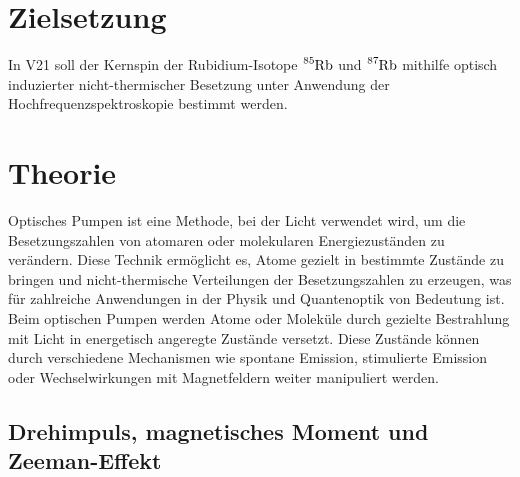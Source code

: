 \section{Zielsetzung}
\label{sec:Zielsetzung}
In V21 soll der Kernspin der Rubidium-Isotope $\ce{^{85}Rb}$ und $\ce{^{87}Rb}$ mithilfe optisch induzierter nicht-thermischer Besetzung unter 
Anwendung der Hochfrequenzspektroskopie bestimmt werden.

\section{Theorie}
\label{sec:Theorie}
Optisches Pumpen ist eine Methode, bei der Licht verwendet wird, um die Besetzungszahlen von atomaren oder molekularen Energiezuständen zu verändern.
Diese Technik ermöglicht es, Atome gezielt in bestimmte Zustände zu bringen und nicht-thermische Verteilungen der Besetzungszahlen zu erzeugen, was für zahlreiche Anwendungen in der Physik und Quantenoptik von Bedeutung ist.\\
Beim optischen Pumpen werden Atome oder Moleküle durch gezielte Bestrahlung mit Licht in energetisch angeregte Zustände versetzt. Diese Zustände können durch verschiedene Mechanismen 
wie spontane Emission, stimulierte Emission oder Wechselwirkungen mit Magnetfeldern weiter manipuliert werden.

\subsection{Drehimpuls, magnetisches Moment und Zeeman-Effekt}
\label{subsec:Drehimpuls}

